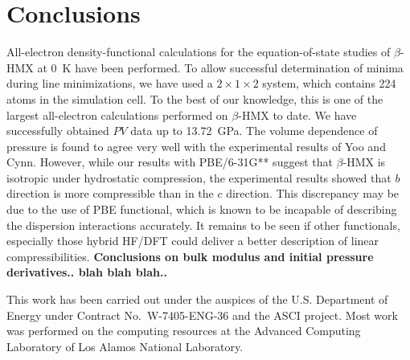 \commentoutA{\documentclass[prl,aps,twocolumn,twocolumngrid,superbib]{revtex4}}
\begin{document}
\section{Conclusions}
All-electron density-functional calculations for the equation-of-state
studies of $\beta$-HMX at 0~K have been performed. To allow successful
determination of minima during line minimizations, we have used a
$2\times 1 \times 2$ system, which contains 224 atoms in the
simulation cell. To the best of our knowledge, this is one of the
largest all-electron calculations performed on $\beta$-HMX to date.
We have successfully obtained $PV$ data up to 13.72~GPa.  The volume
dependence of pressure is found to agree very well with the
experimental results of Yoo and Cynn\cite{Yoo_1999v111}. However,
while our results with PBE/6-31G** suggest that $\beta$-HMX is
isotropic under hydrostatic compression, the experimental results
showed that $b$ direction is more compressible than in the $c$
direction.  This discrepancy may be due to the use of PBE functional,
which is known to be incapable of describing the dispersion
interactions accurately\cite{WKohn98v80}.  It remains to be seen if
other functionals, especially those hybrid HF/DFT could deliver a
better description of linear compressibilities.  {\bf Conclusions on
bulk modulus and initial pressure derivatives.. blah blah blah..}

\begin{acknowledgments}
This work has been carried out under the auspices of the
U.S. Department of Energy under Contract No.~W-7405-ENG-36 and the
ASCI project.  Most work was performed on the computing resources at
the Advanced Computing Laboratory of Los Alamos National Laboratory.
\end{acknowledgments}

 
\end{document}
